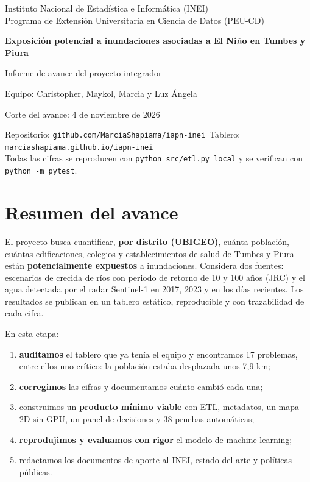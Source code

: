 \documentclass[11pt,a4paper]{article}
\newcommand{\cod}[1]{\texttt{\small #1}}
\begin{document}
\begin{titlepage}
\centering
\vspace*{2cm}
{\large Instituto Nacional de Estadística e Informática (INEI)\\[2pt]
Programa de Extensión Universitaria en Ciencia de Datos (PEU-CD)\par}
\vspace{2.5cm}
{\LARGE\bfseries\color{azul} Exposición potencial a inundaciones asociadas a El Niño en Tumbes y Piura\par}
\vspace{0.6cm}
{\Large Informe de avance del proyecto integrador\par}
\vspace{2.5cm}
{\large Equipo: Christopher, Maykol, Marcia y Luz Ángela\par}
\vspace{0.4cm}
{\large Corte del avance: 4 de noviembre de 2026\par}
\vfill
{\small Repositorio: \cod{github.com/MarciaShapiama/iapn-inei}\ Tablero: \cod{marciashapiama.github.io/iapn-inei}\\
Todas las cifras se reproducen con \cod{python src/etl.py local} y se verifican con \cod{python -m pytest}.\par}
\end{titlepage}

\tableofcontents
\newpage

\section*{Resumen del avance}

El proyecto busca cuantificar, \textbf{por distrito (UBIGEO)}, cuánta población, cuántas edificaciones, colegios y establecimientos de salud de Tumbes y Piura están \textbf{potencialmente expuestos} a inundaciones. Considera dos fuentes: escenarios de crecida de ríos con periodo de retorno de 10 y 100 años (JRC) y el agua detectada por el radar Sentinel-1 en 2017, 2023 y en los días recientes. Los resultados se publican en un tablero estático, reproducible y con trazabilidad de cada cifra.

En esta etapa:
\begin{enumerate}
\item \textbf{auditamos} el tablero que ya tenía el equipo y encontramos 17 problemas, entre ellos uno crítico: la población estaba desplazada unos 7,9 km;
\item \textbf{corregimos} las cifras y documentamos cuánto cambió cada una;
\item construimos un \textbf{producto mínimo viable} con ETL, metadatos, un mapa 2D sin GPU, un panel de decisiones y 38 pruebas automáticas;
\item \textbf{reprodujimos y evaluamos con rigor} el modelo de machine learning;
\item redactamos los documentos de aporte al INEI, estado del arte y políticas públicas.
\end{enumerate}
\end{document}
